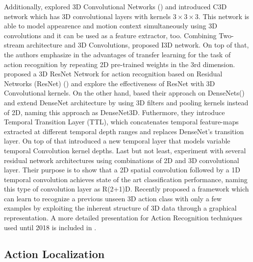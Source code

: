 Additionally, \cite{Tran2014LearningSF} explored 3D Convolutional Networks (\cite{pmid:22392705}) and introduced C3D network which  has
3D convolutional layers with kernels $ 3 \times 3 \times 3$.
This network is able to  model appearence and motion context simultaneously using 3D convolutions and it can be used as a feature extractor, too.
Combining Two-stream architecture and 3D Convolutions, \cite{DBLP:journals/corr/CarreiraZ17} proposed
I3D network. On top of that, the authors emphasize in the advantages of transfer learning for the task of action recognition by repeating 2D pre-trained weights
in the 3rd dimension. \cite{DBLP:journals/corr/abs-1708-07632} proposed a 3D ResNet Network for action recognition based on Residual Networks (ResNet)
(\cite{DBLP:journals/corr/HeZRS15}) and explore the effectiveness of ResNet with 3D Convolutional kernels.
On the other hand, \cite{DBLP:journals/corr/abs-1711-08200}  based their approach on DenseNets(\cite{DBLP:journals/corr/HuangLW16a}) and extend
DenseNet architecture by using 3D filters and pooling kernels instead of 2D, naming this approach as DenseNet3D. Futhermore, they introduce
Temporal Transition Layer (TTL), which concatenates temporal feature-maps extracted at different temporal depth ranges and replaces DenseNet's
transition layer. On top of that \cite{DBLP:DibaFSKAYG18} introduced  a new temporal layer that models variable  temporal Convolution kernel depths.
Last but not least, \cite{DBLP:journals/corr/abs-1711-11248} experiment with several residual network architectures using combinations of 2D and 3D convolutional layer. Their purpose is
to show that a 2D spatial convolution followed by a 1D temporal convolution achieves state of the art classification performance, naming
this type of convolution layer as R(2+1)D. 
Recently \cite{Guo_2018_ECCV} proposed a framework which can learn to recognize a previous unseen 3D action class with only a few examples
by exploiting the inherent structure of 3D data through a graphical representation. A more detailed presentation for Action Recognition techniques used until 2018 is included in
\cite{DBLP:journals/corr/abs-1806-11230}.

\subsection{Action Localization}

